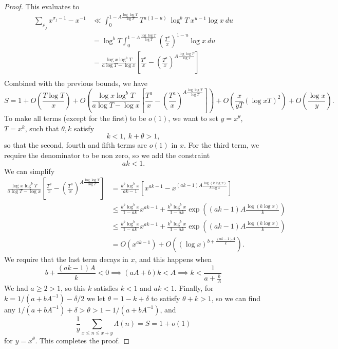 \begin{proof}
    This evaluates to 
    \begin{align*}
        \sum_{\rho_j} x^{\sigma_j-1} - x^{-1} & \ll \int_0^{1-A\frac{\log \log T}{\log T}} T^{a(1-u)} \ \log^b T \  x^{u-1} \log x \ du\\
        &= \log^b T \int_0^{1-A\frac{\log \log T}{\log T}} \left(\frac{T^{a}}{x}\right)^{1-u} \log x \ du\\
        &= \frac{\log x \log^{b} T}{a \log T - \log x } \left[\frac{T^a}{x}-\left(\frac{T^a}{x}\right)^{A\frac{\log \log T}{\log T}}\right]\\
    \end{align*}
    Combined with the previous bounds, we have \[
        S=1 + O\left(\frac{T\log T}{x}\right)+ O\left( \frac{\log x \log^{b} T}{a \log T - \log x } \left[\frac{T^a}{x}-\left(\frac{T^a}{x}\right)^{A\frac{\log \log T}{\log T}}\right]\right)+ O(\frac{x}{yT}(\log xT) ^2) + O(\frac{\log x}{y}) . 
    \]
    To make all terms (except for the first) to be $o(1)$, we want to set 
    $y=x^\theta$, $T=x^k$, such that $\theta,k$ satisfy \[
        k<1, \ k+\theta>1, 
    \]
    so that the second, fourth and fifth terms are $o(1)$ in $x$. 
    For the third term, we require the denominator to be non zero, so we add the constraint \[
        ak<1.
    \]We can simplify \begin{align*}
        \frac{\log x \log^{b} T}{a \log T - \log x } \left[\frac{T^a}{x}-\left(\frac{T^a}{x}\right)^{A\frac{\log \log T}{\log T}}\right]
        &= \frac{k^b \log^{b}x}{ak-1}  \left[x^{ak-1}-x^{(ak-1)A\frac{\log (k \log x)}{k \log x}}\right]
        \\ &\leq \frac{k^b \log^{b}x}{1-ak} x^{ak-1}  + \frac{k^b \log^{b}x}{1-ak} \exp\left((ak-1)A\frac{\log (k \log x)}{k} \right)\\
        &\leq \frac{k^b \log^{b}x}{1-ak} x^{ak-1}  + \frac{k^b \log^{b}x}{1-ak} \exp\left((ak-1)A\frac{\log (k \log x)}{k} \right)\\
        & =O(x^{ak-1})+O\left(\left(\log  x\right)^{b+\frac{(ak-1)A}{k}}\right).
    \end{align*}
    We require that the last term decays in $x$, and this happens when \[
        b+\frac{(ak-1)A}{k}< 0 \implies (aA+b)k<A \implies k < \frac{1}{a+\frac{b}{A}}
    \]
    We had $a\geq 2 >1$, so this $k$ satisfies $k<1$ and $ak<1$.
    Finally, for $k={1}/({a+bA^{-1}})- \delta/2$ we let $\theta = 1-k+\delta$ to satisfy $\theta+k>1$,
    so we can find any ${1}/({a+bA^{-1}})+\delta >\theta>1-{1}/({a+bA^{-1}})$, and \[
        \frac{1}{y}\sum_{x\leq n \leq x+y} \Lambda(n) = S = 1+o(1)
    \]for $y=x^\theta$. This completes the proof.

\end{proof}
